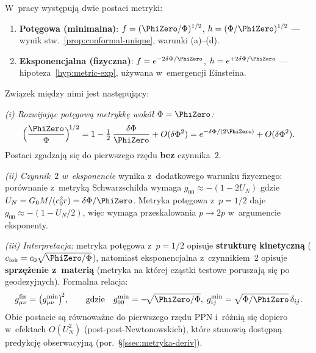 \begin{remark}%
\label{rem:power-vs-exp}
W~pracy wyst\k{e}puj\k{a} dwie postaci metryki:
\begin{enumerate}[nosep]
  \item \textbf{Pot\k{e}gowa (minimalna)}:
    $f = (\PhiZero/\Phi)^{1/2}$,
    $h = (\Phi/\PhiZero)^{1/2}$
    --- wynik stw.~\ref{prop:conformal-unique}, warunki (a)--(d).
  \item \textbf{Eksponencjalna (fizyczna)}:
    $f = e^{-2\delta\Phi/\PhiZero}$,
    $h = e^{+2\delta\Phi/\PhiZero}$
    --- hipoteza~\ref{hyp:metric-exp}, u\.zywana w~emergencji Einsteina.
\end{enumerate}
Zwi\k{a}zek mi\k{e}dzy nimi jest nast\k{e}puj\k{a}cy:

\medskip\noindent
\emph{(i) Rozwijaj\k{a}c pot\k{e}gow\k{a} metrykk\k{e} wok\'o\l{} $\Phi = \PhiZero$:}
\[
  \Bigl(\frac{\PhiZero}{\Phi}\Bigr)^{\!1/2}
  = 1 - \tfrac{1}{2}\,\frac{\delta\Phi}{\PhiZero}
  + O(\delta\Phi^2)
  = e^{-\delta\Phi/(2\PhiZero)} + O(\delta\Phi^2).
\]
Postaci zgadzaj\k{a} si\k{e} do pierwszego rz\k{e}du
\textbf{bez} czynnika~$2$.

\medskip\noindent
\emph{(ii) Czynnik~$2$ w~eksponencie} wynika z~dodatkowego
warunku fizycznego: por\'ownanie z~metryk\k{a} Schwarzschilda
wymaga $g_{00} \approx -(1 - 2U_N)$ gdzie
$U_N = G_0 M/(c_0^2 r) = \delta\Phi/\PhiZero$.
Metryka pot\k{e}gowa z~$p = 1/2$ daje $g_{00} \approx -(1 - U_N/2)$,
wi\k{e}c wymaga przeskalowania $p \to 2p$
w~argumencie eksponenty.

\medskip\noindent
\emph{(iii) Interpretacja:} metryka pot\k{e}gowa z~$p = 1/2$
opisuje \textbf{struktur\k{e} kinetyczn\k{a}} ($c_{\mathrm{lok}}
= c_0 \sqrt{\PhiZero/\Phi}$), natomiast eksponencjalna
z~czynnikiem~$2$ opisuje \textbf{sprz\k{e}\.zenie z~materi\k{a}}
(metryka na kt\'orej cz\k{a}stki testowe poruszaj\k{a} si\k{e}
po geodezyjnych). Formalna relacja:
\begin{equation}\label{eq:metric-power-exp}
  g^{\mathrm{fiz}}_{\mu\nu}
  = \bigl(g^{\mathrm{min}}_{\mu\nu}\bigr)^{\!2},
  \qquad\text{gdzie}\quad
  g^{\mathrm{min}}_{00} = -\!\sqrt{\PhiZero/\Phi},\;
  g^{\mathrm{min}}_{ij} = \sqrt{\Phi/\PhiZero}\,\delta_{ij}.
\end{equation}
Obie postacie s\k{a} r\'ownowa\.zne do pierwszego rz\k{e}du PPN
i~r\'o\.zni\k{a} si\k{e} dopiero w~efektach $O(U_N^2)$
(post-post-Newtonowskich), kt\'ore stanowi\k{a} dost\k{e}pn\k{a}
predykcj\k{e} obserwacyjn\k{a} (por.\ \S\ref{ssec:metryka-deriv}).
\end{remark}

